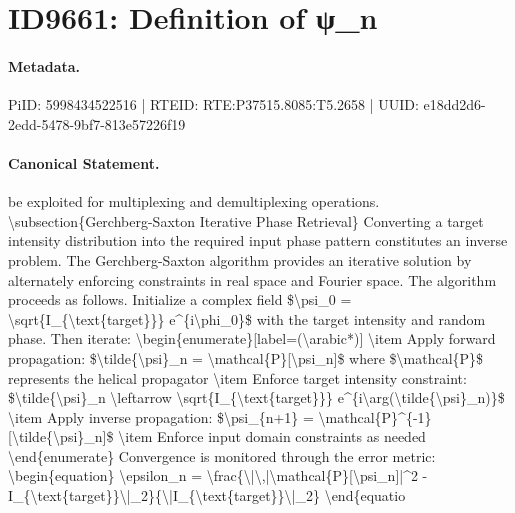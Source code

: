 \section*{ID9661: Definition of ψ\_n}
\paragraph{Metadata.}
PiID: 5998434522516 | RTEID: RTE:P37515.8085:T5.2658 | UUID: e18dd2d6-2edd-5478-9bf7-813e57226f19

\paragraph{Canonical Statement.}
be exploited for multiplexing and demultiplexing operations. \textbackslash{}subsection\{Gerchberg-Saxton Iterative Phase Retrieval\} Converting a target intensity distribution into the required input phase pattern constitutes an inverse problem. The Gerchberg-Saxton algorithm provides an iterative solution by alternately enforcing constraints in real space and Fourier space. The algorithm proceeds as follows. Initialize a complex field \$\textbackslash{}psi\_0 = \textbackslash{}sqrt\{I\_\{\textbackslash{}text\{target\}\}\} e\textasciicircum{}\{i\textbackslash{}phi\_0\}\$ with the target intensity and random phase. Then iterate: \textbackslash{}begin\{enumerate\}[label=(\textbackslash{}arabic*)] \textbackslash{}item Apply forward propagation: \$\textbackslash{}tilde\{\textbackslash{}psi\}\_n = \textbackslash{}mathcal\{P\}[\textbackslash{}psi\_n]\$ where \$\textbackslash{}mathcal\{P\}\$ represents the helical propagator \textbackslash{}item Enforce target intensity constraint: \$\textbackslash{}tilde\{\textbackslash{}psi\}\_n \textbackslash{}leftarrow \textbackslash{}sqrt\{I\_\{\textbackslash{}text\{target\}\}\} e\textasciicircum{}\{i\textbackslash{}arg(\textbackslash{}tilde\{\textbackslash{}psi\}\_n)\}\$ \textbackslash{}item Apply inverse propagation: \$\textbackslash{}psi\_\{n+1\} = \textbackslash{}mathcal\{P\}\textasciicircum{}\{-1\}[\textbackslash{}tilde\{\textbackslash{}psi\}\_n]\$ \textbackslash{}item Enforce input domain constraints as needed \textbackslash{}end\{enumerate\} Convergence is monitored through the error metric: \textbackslash{}begin\{equation\} \textbackslash{}epsilon\_n = \textbackslash{}frac\{\textbackslash{}|\textbackslash{},|\textbackslash{}mathcal\{P\}[\textbackslash{}psi\_n]|\textasciicircum{}2 - I\_\{\textbackslash{}text\{target\}\}\textbackslash{}|\_2\}\{\textbackslash{}|I\_\{\textbackslash{}text\{target\}\}\textbackslash{}|\_2\} \textbackslash{}end\{equatio

